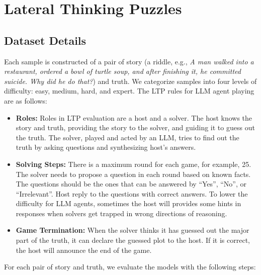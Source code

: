 \section{Lateral Thinking Puzzles} \label{app:ltp}
\subsection{Dataset Details}
Each sample is constructed of a pair of story (a riddle, e.g., \textit{A man walked into a restaurant, ordered a bowl of turtle soup, and after finishing it, he committed suicide. Why did he do that?}) and truth. 
We categorize samples into four levels of difficulty: easy, medium, hard, and expert. 
The LTP rules for LLM agent playing are as follows:

\begin{itemize}[leftmargin=1.5em,itemsep=0pt,parsep=0.2em,topsep=0.0em,partopsep=0.0em]
    \item \textbf{Roles:} Roles in LTP evaluation are a host and a solver. The host knows the story and truth, providing the story to the solver, and guiding it to guess out the truth. The solver, played and acted by an LLM, tries to find out the truth by asking questions and synthesizing host's answers.
    \item \textbf{Solving Steps:} There is a maximum round for each game, for example, 25. The solver needs to propose a question in each round based on known facts. The questions should be the ones that can be answered by ``Yes'', ``No'', or ``Irrelevant''. Host reply to the questions with correct answers. To lower the difficulty for LLM agents, sometimes the host will provides some hints in responses when solvers get trapped in wrong directions of reasoning.
    \item \textbf{Game Termination:} When the solver thinks it has guessed out the major part of the truth, it can declare the guessed plot to the host. If it is correct, the host will announce the end of the game.
\end{itemize}

For each pair of story and truth, we evaluate the models with the following steps:

